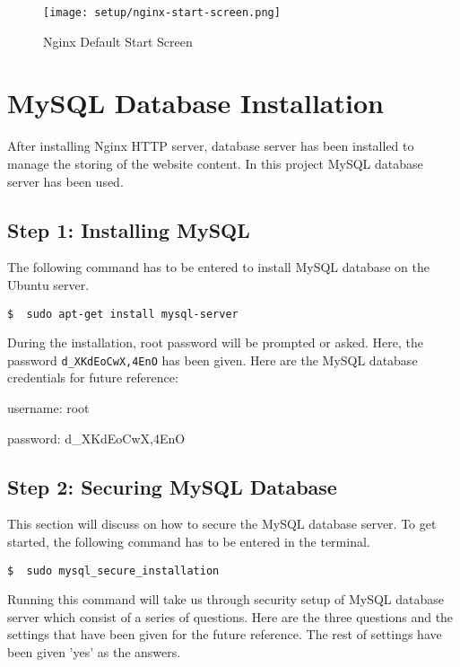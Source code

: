 \begin{figure}[ht]
\caption{Nginx Default Start Screen}
\label{fig:nginx-start-screen}
\centering
\texttt{[image: setup/nginx-start-screen.png]}
\end{figure}


\section{MySQL Database Installation} \label{sec:mysql-database-installation}
After installing Nginx HTTP server, database server has been installed to manage the storing of the website content. In this project MySQL database server has been used.

\subsection{Step 1: Installing MySQL}
The following command has to be entered to install MySQL database on the Ubuntu server. 
\begin{lstlisting}
$  sudo apt-get install mysql-server
\end{lstlisting}

During the installation, root password will be prompted or asked. Here, the password \texttt{d\_XKdEoCwX,4EnO} has been given. Here are the MySQL database credentials for future reference:
\begin{itemize*}
\item username: root
\item password: d\_XKdEoCwX,4EnO
\end{itemize*}

\subsection{Step 2: Securing MySQL Database}
This section will discuss on how to secure the MySQL database server. To get started, the following command has to be entered in the terminal.
\begin{lstlisting}
$  sudo mysql_secure_installation
\end{lstlisting}

Running this command will take us through security setup of MySQL database server which consist of a series of questions. Here are the three questions and the settings that have been given for the future reference. The rest of settings have been given 'yes' as the answers.

